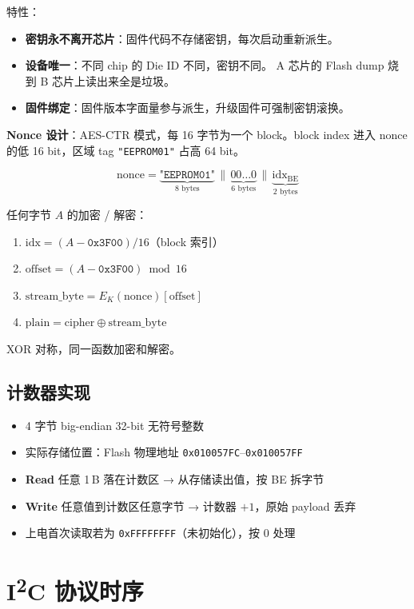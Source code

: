 \documentclass[UTF8,a4paper,11pt]{ctexart}
\newcommand{\hex}[1]{\texttt{0x#1}}
\begin{document}
特性：
\begin{itemize}
    \item \textbf{密钥永不离开芯片}：固件代码不存储密钥，每次启动重新派生。
    \item \textbf{设备唯一}：不同 chip 的 Die ID 不同，密钥不同。
          A 芯片的 Flash dump 烧到 B 芯片上读出来全是垃圾。
    \item \textbf{固件绑定}：固件版本字面量参与派生，升级固件可强制密钥滚换。
\end{itemize}

\textbf{Nonce 设计}：AES-CTR 模式，每 16 字节为一个 block。block index 进入
nonce 的低 16 bit，区域 tag \texttt{"EEPROM01"} 占高 64 bit。

\[
  \mathrm{nonce} = \underbrace{\texttt{"EEPROM01"}}_{\text{8 bytes}} \,\|\,
                   \underbrace{00\dots0}_{\text{6 bytes}} \,\|\,
                   \underbrace{\mathrm{idx}_{\text{BE}}}_{\text{2 bytes}}
\]

任何字节 $A$ 的加密 / 解密：
\begin{enumerate}
    \item $\mathrm{idx} = (A - \hex{3F00}) / 16$（block 索引）
    \item $\mathrm{offset} = (A - \hex{3F00}) \bmod 16$
    \item $\mathrm{stream\_byte} = E_K(\mathrm{nonce})[\mathrm{offset}]$
    \item $\mathrm{plain} = \mathrm{cipher} \oplus \mathrm{stream\_byte}$
\end{enumerate}

XOR 对称，同一函数加密和解密。

\subsection{计数器实现}

\begin{itemize}
    \item 4 字节 big-endian 32-bit 无符号整数
    \item 实际存储位置：Flash 物理地址 \hex{010057FC}--\hex{010057FF}
    \item \textbf{Read} 任意 1\,B 落在计数区 → 从存储读出值，按 BE 拆字节
    \item \textbf{Write} 任意值到计数区任意字节 → 计数器 $+1$，原始 payload 丢弃
    \item 上电首次读取若为 \hex{FFFFFFFF}（未初始化），按 $0$ 处理
\end{itemize}

\section{I\textsuperscript{2}C 协议时序}
\end{document}
